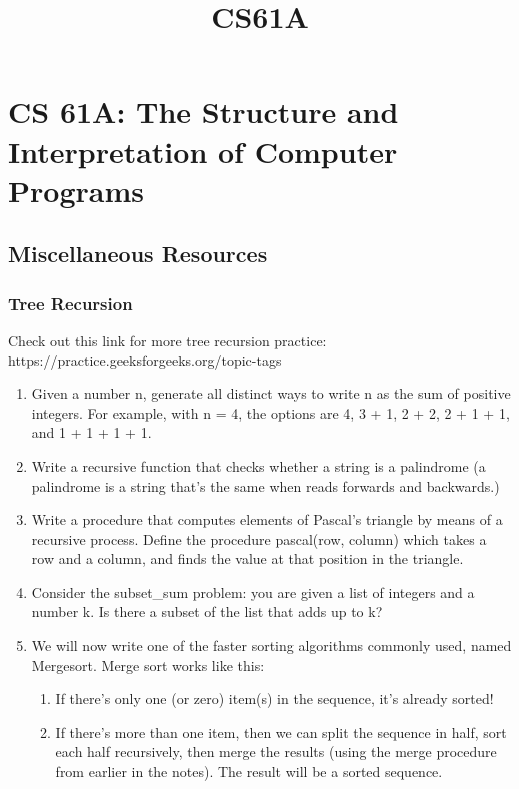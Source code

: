 \documentclass[11pt]{article}
\title{CS61A}
\providecommand{\tightlist}{%
      \setlength{\itemsep}{0pt}\setlength{\parskip}{0pt}}
\begin{document}
    
    
    \maketitle
    
    

    
    \section{CS 61A: The Structure and Interpretation of Computer
Programs}\label{cs-61a-the-structure-and-interpretation-of-computer-programs}

    \subsection{Miscellaneous Resources}\label{miscellaneous-resources}

    \subsubsection{Tree Recursion}\label{tree-recursion}

Check out this link for more tree recursion practice:
https://practice.geeksforgeeks.org/topic-tags

\begin{enumerate}
\def\labelenumi{\arabic{enumi}.}
\item
  Given a number n, generate all distinct ways to write n as the sum of
  positive integers. For example, with n = 4, the options are 4, 3 + 1,
  2 + 2, 2 + 1 + 1, and 1 + 1 + 1 + 1.
\item
  Write a recursive function that checks whether a string is a
  palindrome (a palindrome is a string that's the same when reads
  forwards and backwards.)
\item
  Write a procedure that computes elements of Pascal's triangle by means
  of a recursive process. Define the procedure pascal(row, column) which
  takes a row and a column, and finds the value at that position in the
  triangle.
\item
  Consider the subset\_sum problem: you are given a list of integers and
  a number k. Is there a subset of the list that adds up to k?
\item
  We will now write one of the faster sorting algorithms commonly used,
  named Mergesort. Merge sort works like this:

  \begin{enumerate}
  \def\labelenumii{\alph{enumii}.}
  \tightlist
  \item
    If there's only one (or zero) item(s) in the sequence, it's already
    sorted!
  \item
    If there's more than one item, then we can split the sequence in
    half, sort each half recursively, then merge the results (using the
    merge procedure from earlier in the notes). The result will be a
    sorted sequence.
  \end{enumerate}
\end{enumerate}
\end{document}
